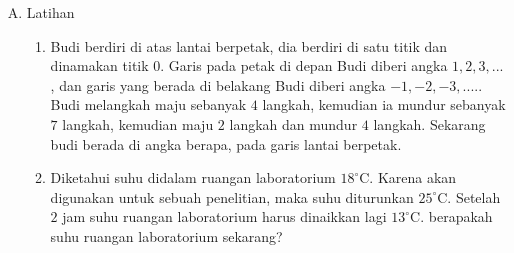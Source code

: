 \documentclass[a5paper,10pt,openany]{book}
\begin{document}
{\begin{enumerate}[A.,leftmargin=*,itemsep=-4pt,topsep=2pt]
\begin{itemize}[\faCheckSquare,leftmargin=*,itemsep=4pt,topsep=2pt]
		\item Letakkan dadu diatas titik berwarna orange, lalu kalian tuliskan angka nol.
		\item Geserkanlah dadu diatas kesebelah kanan, satu langkah tulis $+$. Tanda $+$ bisa tidak di tuliskan.
		\item Kembali dadu ke lingkaran orange atau angka nol.
		\item Geserkan dadu kesebelah kiri, satu langkah tulis $-1$.
		\item Dari pergeseran dadu ke kiri dan kekanan didapat angka $1$ yang berbeda atau lawannya. Ke   kanan $+1$ dan ke kiri $-1$.
		\item Coba kalian ulangi pergesaran dadu seperti cara nomor $3, 4, 5$ dan $6$ apabila kekanan atau kekiri dadunya.
		\item Tuliskan hasil pergeseran dadu tadi kedalam karton yang kalian buat sesuai banyaknya langkah dalam bentuk bilangan.
			\begin{center}
			\texttt{[image: bil1]}	
		\end{center}
		\item Gabungkan bilangan-bilangan yang diperoleh berdasarkan urutan dari gambar yang diperoleh di karton yang kalian buat \{ ...., ...., ...., ...., ...., ...., ...., ...., .... ,...., ....\}
		\item Berdasarkan kegiatan diatas, maka diperoleh tiga macam bilangan yang terdiri dari:
		\begin{enumerate}[a.]
			\item ...
			\item ...
			\item ...
		\end{enumerate}
	\end{itemize}


	\item Latihan\\[-10pt]
		\begin{enumerate}[1.]
		\item Budi berdiri di atas lantai berpetak, dia berdiri di satu titik dan dinamakan titik $0$. Garis pada petak di depan Budi diberi angka $1, 2, 3, ...$, dan garis yang berada di belakang Budi diberi angka $-1, -2, -3, ....$. Budi melangkah maju sebanyak $4$ langkah, kemudian ia mundur sebanyak $7$ langkah, kemudian maju $2$ langkah dan mundur $4$ langkah. Sekarang budi berada di angka berapa, pada garis lantai berpetak.
		\item Diketahui suhu didalam ruangan laboratorium $18^\circ$C. Karena akan digunakan untuk sebuah penelitian, maka suhu diturunkan $25^\circ$C. Setelah $2$ jam suhu ruangan laboratorium harus dinaikkan lagi $13^\circ$C. berapakah suhu ruangan laboratorium sekarang?
	\end{enumerate}
\end{enumerate}
}
\end{document}

